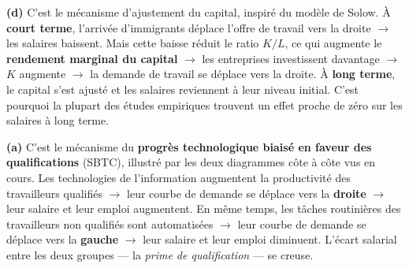 
\begin{reponse}
\textbf{(d)} C'est le mécanisme d'ajustement du capital, inspiré du modèle de Solow. À \textbf{court terme}, l'arrivée d'immigrants déplace l'offre de travail vers la droite $\to$ les salaires baissent. Mais cette baisse réduit le ratio $K/L$, ce qui augmente le \textbf{rendement marginal du capital} $\to$ les entreprises investissent davantage $\to$ $K$ augmente $\to$ la demande de travail se déplace vers la droite. À \textbf{long terme}, le capital s'est ajusté et les salaires reviennent à leur niveau initial. C'est pourquoi la plupart des études empiriques trouvent un effet proche de zéro sur les salaires à long terme.
\end{reponse}


\begin{reponse}
\textbf{(a)} C'est le mécanisme du \textbf{progrès technologique biaisé en faveur des qualifications} (SBTC), illustré par les deux diagrammes côte à côte vus en cours. Les technologies de l'information augmentent la productivité des travailleurs qualifiés $\to$ leur courbe de demande se déplace vers la \textbf{droite} $\to$ leur salaire et leur emploi augmentent. En même temps, les tâches routinières des travailleurs non qualifiés sont automatisées $\to$ leur courbe de demande se déplace vers la \textbf{gauche} $\to$ leur salaire et leur emploi diminuent. L'écart salarial entre les deux groupes --- la \textit{prime de qualification} --- se creuse.
\end{reponse}


